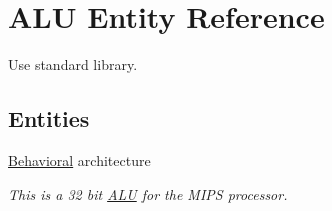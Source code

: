 \hypertarget{class_a_l_u}{\section{\-A\-L\-U \-Entity \-Reference}
\label{class_a_l_u}
}


\-Use standard library.  


\subsection*{\-Entities}
\begin{DoxyCompactItemize}
\item 
\hyperlink{class_a_l_u_1_1_behavioral}{\-Behavioral} architecture
\begin{DoxyCompactList}\small\item\em \-This is a 32 bit \hyperlink{class_a_l_u}{\-A\-L\-U} for the \-M\-I\-P\-S processor. \end{DoxyCompactList}\end{DoxyCompactItemize}
\*
\*
